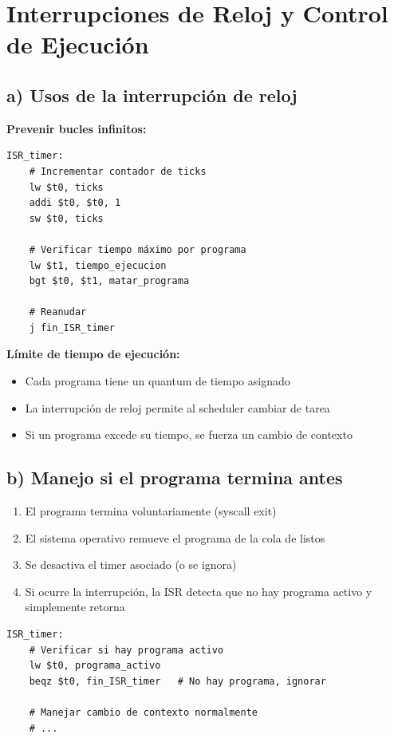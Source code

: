 \documentclass[12pt,a4paper]{article}
\begin{document}
\section{Interrupciones de Reloj y Control de Ejecución}

\subsection{a) Usos de la interrupción de reloj}

\textbf{Prevenir bucles infinitos:}
\begin{lstlisting}[style=mipsstyle, caption={Timer como watchdog}]
ISR_timer:
    # Incrementar contador de ticks
    lw $t0, ticks
    addi $t0, $t0, 1
    sw $t0, ticks
    
    # Verificar tiempo máximo por programa
    lw $t1, tiempo_ejecucion
    bgt $t0, $t1, matar_programa
    
    # Reanudar
    j fin_ISR_timer
\end{lstlisting}

\textbf{Límite de tiempo de ejecución:}
\begin{itemize}
    \item Cada programa tiene un quantum de tiempo asignado
    \item La interrupción de reloj permite al scheduler cambiar de tarea
    \item Si un programa excede su tiempo, se fuerza un cambio de contexto
\end{itemize}

\subsection{b) Manejo si el programa termina antes}
\begin{enumerate}
    \item El programa termina voluntariamente (syscall exit)
    \item El sistema operativo remueve el programa de la cola de listos
    \item Se desactiva el timer asociado (o se ignora)
    \item Si ocurre la interrupción, la ISR detecta que no hay programa activo y simplemente retorna
\end{enumerate}

\begin{lstlisting}[style=mipsstyle]
ISR_timer:
    # Verificar si hay programa activo
    lw $t0, programa_activo
    beqz $t0, fin_ISR_timer   # No hay programa, ignorar
    
    # Manejar cambio de contexto normalmente
    # ...
\end{lstlisting}
\end{document}
